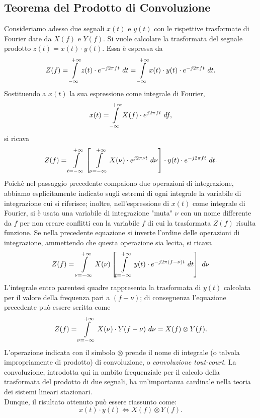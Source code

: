 \documentclass[12pt,oneside,openany]{memoir}
\numberwithin{equation}{subsection}
\newcommand{\dt}{\ dt}
\newcommand{\df}{\ df}
\begin{document}
\newpage
\subsection{Teorema del Prodotto di Convoluzione}
Consideriamo adesso due segnali $x(t)$ e $y(t)$ con le rispettive trasformate di
Fourier date da $X(f)$ e $Y(f)$. Si vuole calcolare la trasformata del segnale
prodotto $z(t) = x(t) \cdot y(t)$. Essa \`e espressa da
\[
    Z(f) = \int\displaylimits_{-\infty}^{+\infty} z(t) \cdot 
    e^{-j 2 \pi f t} \dt = \int\displaylimits_{-\infty}^{+\infty} x(t) \cdot 
    y(t) \cdot e^{-j 2 \pi f t} \dt.
\]
Sostituendo a $x(t)$ la sua espressione come integrale di Fourier,
\[
    x(t) = \int\displaylimits_{-\infty}^{+\infty} X(f) \cdot e^{j 2 \pi f t}
    \df,
\]
si ricava
\[
    Z(f) = \int\displaylimits_{t = -\infty}^{+\infty} \left[
        \int\displaylimits_{\nu = -\infty}^{+\infty} X(\nu) \cdot
        e^{j 2 \pi \nu t} \ d \nu
    \right] \cdot y(t) \cdot e^{-j 2 \pi f t} \dt.
\]
Poich\`e nel passaggio precedente compaiono due operazioni di integrazione,
abbiamo esplicitamente indicato sugli estremi di ogni integrale la variabile di
integrazione cui si riferisce; inoltre, nell'espressione di $x(t)$ come
integrale di Fourier, si \`e usata una variabile di integrazione "muta" $\nu$ 
con un nome differente da $f$ per non creare conflitti con la variabile $f$ di
cui la trasformata $Z(f)$ risulta funzione. Se nella precedente equazione si
inverte l'ordine delle operazioni di integrazione, ammettendo che questa
operazione sia lecita, si ricava
\[
    Z(f) = \int\displaylimits_{\nu = -\infty}^{+\infty} X(\nu) \left[
        \int\displaylimits_{t = -\infty}^{+\infty} y(t) \cdot
        e^{-j 2 \pi (f - \nu) t} \dt
    \right] \ d \nu
\]
L'integrale entro parentesi quadre rappresenta la trasformata di $y(t)$
calcolata per il valore della frequenza pari a $(f - \nu)$; di conseguenza
l'equazione precedente pu\`o essere scritta come
\[
    Z(f) = \int\displaylimits_{\nu = -\infty}^{+\infty} X(\nu) \cdot Y(f - \nu)
    \ d \nu = X(f) \otimes Y(f).
\]
L'operazione indicata con il simbolo $\otimes$ prende il nome di integrale (o
talvola impropriamente di prodotto) di convoluzione, o \textit{convoluzione
tout-court}. La convoluzione, introdotta qui in ambito frequenziale per il
calcolo della trasformata del prodotto di due segnali, ha un'importanza 
cardinale nella teoria dei sistemi lineari stazionari.\\
Dunque, il risultato ottenuto pu\`o essere riassunto come:
\[
    x(t) \cdot y(t) \iff X(f) \otimes Y(f).
\]
\end{document}
